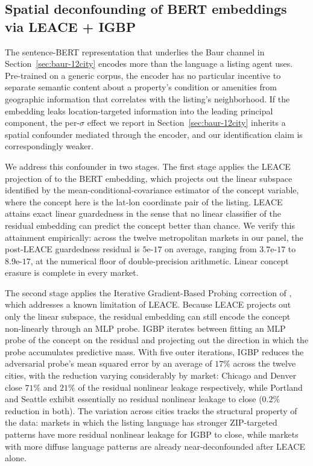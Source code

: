 
\subsection{Spatial deconfounding of BERT embeddings via LEACE + IGBP}
\label{sec:leace-12}

The sentence-BERT representation that underlies the Baur channel in
Section~\ref{sec:baur-12city} encodes more than the language a listing
agent uses. Pre-trained on a generic corpus, the encoder has no
particular incentive to separate semantic content about a property's
condition or amenities from geographic information that correlates
with the listing's neighborhood. If the embedding leaks
location-targeted information into the leading principal component,
the per-$\sigma$ effect we report in Section~\ref{sec:baur-12city}
inherits a spatial confounder mediated through the encoder, and our
identification claim is correspondingly weaker.

We address this confounder in two stages. The first stage applies
the LEACE projection of \citet{belrose2023leace} to the BERT
embedding, which projects out the linear subspace identified by the
mean-conditional-covariance estimator of the concept variable, where
the concept here is the lat-lon coordinate pair of the listing.
LEACE attains exact linear guardedness in the sense that no linear
classifier of the residual embedding can predict the concept better
than chance. We verify this attainment empirically: across the
twelve metropolitan markets in our panel, the post-LEACE
guardedness residual is $5\text{e-}17$ on average, ranging from
$3.7\text{e-}17$ to $8.9\text{e-}17$, at the numerical floor of
double-precision arithmetic. Linear concept erasure is complete in
every market.

The second stage applies the Iterative Gradient-Based Probing
correction of \citet{iskander2023log_linear}, which addresses a known
limitation of LEACE. Because LEACE projects out only the linear
subspace, the residual embedding can still encode the concept
non-linearly through an MLP probe. IGBP iterates between fitting an
MLP probe of the concept on the residual and projecting out the
direction in which the probe accumulates predictive mass. With five
outer iterations, IGBP reduces the adversarial probe's mean squared
error by an average of $17\%$ across the twelve cities, with the
reduction varying considerably by market: Chicago and Denver close
$71\%$ and $21\%$ of the residual nonlinear leakage respectively,
while Portland and Seattle exhibit essentially no residual nonlinear
leakage to close ($0.2\%$ reduction in both). The variation
across cities tracks the structural property of the data: markets
in which the listing language has stronger ZIP-targeted patterns
have more residual nonlinear leakage for IGBP to close, while
markets with more diffuse language patterns are already
near-deconfounded after LEACE alone.

